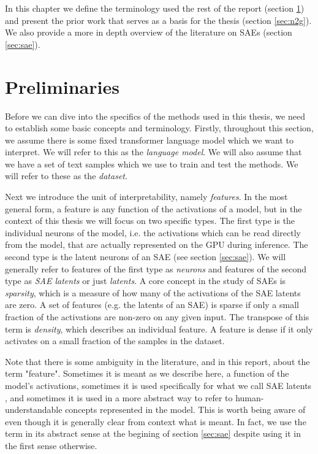 In this chapter we define the terminology used the rest of the report (section \ref{sec:preliminaries}) and present the prior work that serves as a basis for the thesis (section \ref{sec:n2g}).
We also provide a more in depth overview of the literature on SAEs (section \ref{sec:sae}).

\section{Preliminaries}
\label{sec:preliminaries}
Before we can dive into the specifics of the methods used in this thesis, 
we need to establish some basic concepts and terminology.
Firstly, throughout this section, we assume there is some fixed 
transformer language model \parencite{vaswani_attention_2023} 
which we want to interpret.
We will refer to this as the \emph{language model}.
We will also assume that we have a set of text samples 
which we use to train and test the methods.
We will refer to these as the \emph{dataset}.

Next we introduce the unit of interpretability, namely \emph{features}. 
In the most general form, a feature is any function of the activations 
of a model, but in the context of this thesis we will focus on two 
specific types.
The first type is the individual neurons of the model, i.e. the activations which can be read directly from the model, that are actually represented on the GPU during inference.
The second type is the latent neurons of an SAE (see section \ref{sec:sae}).
We will generally refer to features of the first type as \emph{neurons} and features of the second type as \emph{SAE latents} or just \emph{latents}.
A core concept in the study of SAEs is \emph{sparsity}, which is a measure of how many of the activations of the SAE latents are zero.
A set of features (e.g. the latents of an SAE) is sparse if only a small fraction of the activations are non-zero on any given input.
The transpose of this term is \emph{density}, which describes an individual feature.
A feature is dense if it only activates on a small fraction of the samples in the dataset.

Note that there is some ambiguity in the literature, and in this report, about the term "feature".
Sometimes it is meant as we describe here, a function of the model's activations, sometimes it is used specifically for what we call SAE latents \parencite{templeton_scaling_2024}, and sometimes it is used in a more abstract way to refer to human-understandable concepts represented in the model.
This is worth being aware of even though it is generally clear from context what is meant.
In fact, we use the term in its abstract sense at the begining of section \ref{sec:sae} despite using it in the first sense otherwise.

